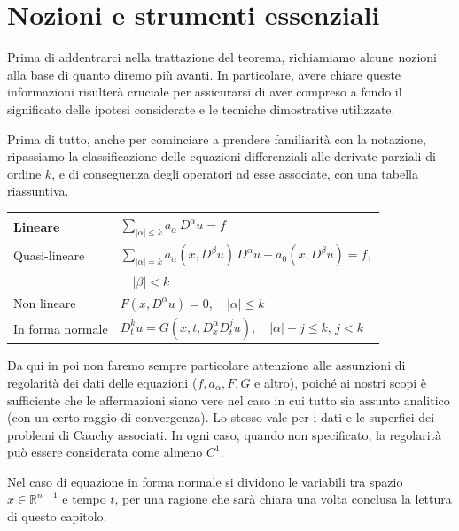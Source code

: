 \chapter{Nozioni e strumenti essenziali} \label{tools}
Prima di addentrarci nella trattazione del teorema, richiamiamo alcune nozioni alla base di quanto diremo più avanti. 
In particolare, avere chiare queste informazioni risulterà cruciale per assicurarsi di aver compreso a fondo il significato delle ipotesi considerate e le tecniche dimostrative utilizzate.

Prima di tutto, anche per cominciare a prendere familiarità con la notazione, ripassiamo la classificazione delle equazioni differenziali alle derivate parziali di ordine $k$, e di conseguenza degli operatori ad esse associate, con una tabella riassuntiva.
\vspace{5mm}
\begin{center}
\renewcommand{\arraystretch}{2}
\begin{tabular}{l l} 
\hline \hline
 Lineare & $\sum_{|\alpha |\leq k} a_\alpha \, D^\alpha u = f$ \\
 \hline
 \vspace{-2mm}
 Quasi-lineare & $\sum_{|\alpha |= k} a_\alpha (x,D^\beta u) \, D^\alpha u +  a_0(x,D^\beta u)= f,$\\
 & $\quad |\beta |<k $ \\
 \hline
 Non lineare & $F(x,D^\alpha u)=0, \quad |\alpha | \leq k$ \\
 \hline
 In forma normale & $D_{t}^k u = G(x,t, D^\alpha_x D^j_t u), \quad |\alpha |+j \leq k, \, j < k$ \\
 \hline \hline
\end{tabular}
\end{center}
\vspace{5mm}
\begin{remark}
Da qui in poi non faremo sempre particolare attenzione alle assunzioni di regolarità dei dati delle equazioni ($f,a_\alpha,F,G$ e altro), poiché ai nostri scopi è sufficiente che le affermazioni siano vere nel caso in cui tutto sia assunto analitico (con un certo raggio di convergenza). Lo stesso vale per i dati e le superfici dei problemi di Cauchy associati. In ogni caso, quando non specificato, la regolarità può essere considerata come almeno $C^1$.
\end{remark}
\begin{remark}
Nel caso di equazione in forma normale si dividono le variabili tra spazio $x\in \mathbb{R}^{n-1}$ e tempo $t$, per una ragione che sarà chiara una volta conclusa la lettura di questo capitolo.
\end{remark}
